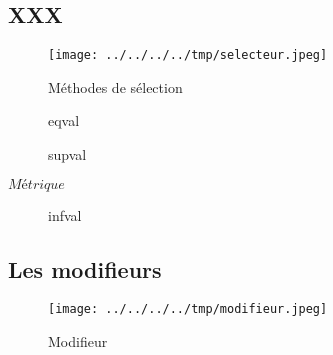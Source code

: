 \subsection{XXX}

\begin{figure}
  \centering
  \texttt{[image: ../../../../tmp/selecteur.jpeg]}
  \caption{Méthodes de sélection}
  \label{fig:methode_selecteur}
\end{figure}






\begin{figure}
  \centering
  
  \caption{eqval}
  \label{fig:select_eqval}
\end{figure}


\begin{figure}
  \centering
  
  \caption{supval}
  \label{fig:select_supval}
\end{figure}

$Métrique$

\begin{figure}
  \centering
  
  \caption{infval}
  \label{fig:select_infval}
\end{figure}

\subsection{Les modifieurs}



\begin{figure}
  \centering
  \texttt{[image: ../../../../tmp/modifieur.jpeg]}
  \caption{Modifieur}
  \label{fig:methode_modifieur}
\end{figure}



